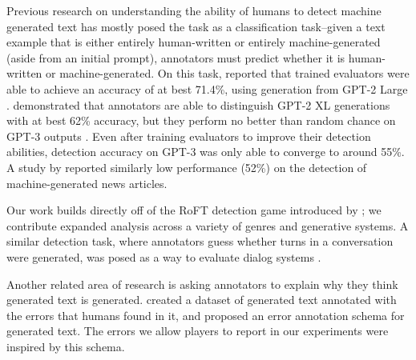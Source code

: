 Previous research on understanding the ability of humans to detect machine generated text has mostly posed the task as a classification task--given a text example that is either entirely human-written or entirely machine-generated (aside from an initial prompt), annotators must predict whether it is human-written or machine-generated.
On this task, \citet{ippolito-etal-2020-automatic} reported that trained evaluators were able to achieve an accuracy of at best 71.4\%, using generation from GPT-2 Large \citep{radford2019language}.
\citet{clark2021all} demonstrated that annotators are able to distinguish GPT-2 XL generations with at best 62\% accuracy, but they perform no better than random chance on GPT-3 outputs \citep{brownetal2020}.
Even after training evaluators to improve their detection abilities, detection accuracy on GPT-3 was only able to converge to around 55\%.
A study by \citet{brownetal2020} reported similarly low performance (52\%) on the detection of machine-generated news articles.

Our work builds directly off of the RoFT detection game introduced by \citet{roft}; we contribute expanded analysis across a variety of genres and generative systems.
A similar detection task, where annotators guess whether turns in a conversation were generated, was posed as a way to evaluate dialog systems \citep{deriu-etal-2020-spot}.

Another related area of research is asking annotators to explain why they think generated text is generated.
\citet{he-etal-2021-tgea} created a dataset of generated text annotated with the errors that humans found in it, and \citet{dou2021scarecrow} proposed an error annotation schema for generated text.
The errors we allow players to report in our experiments were inspired by this schema.


